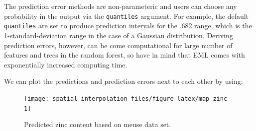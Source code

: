 \documentclass[
  graybox,natbib,nospthms]{svmono}
\newenvironment{Shaded}{\begin{snugshade}}{\end{snugshade}}
\newcommand{\AttributeTok}[1]{\textcolor[rgb]{0.61,0.61,0.61}{#1}}
\newcommand{\ConstantTok}[1]{\textcolor[rgb]{0,0,0}{#1}}
\newcommand{\DecValTok}[1]{\textcolor[rgb]{0.06,0.06,0.06}{#1}}
\newcommand{\FunctionTok}[1]{\textcolor[rgb]{0,0,0}{#1}}
\newcommand{\NormalTok}[1]{#1}
\newcommand{\SpecialCharTok}[1]{\textcolor[rgb]{0,0,0}{#1}}
\newcommand{\StringTok}[1]{\textcolor[rgb]{0.5,0.5,0.5}{#1}}
\begin{document}
The prediction error methods are non-parameteric and users can choose any
probability in the output via the \texttt{quantiles} argument. For example, the default
\texttt{quantiles} are set to produce prediction intervals for the .682 range, which
is the 1-standard-deviation range in the case of a Gaussian distribution.
Deriving prediction errors, however, can be come computational for large number
of features and trees in the random forest, so have in mind that EML comes with
exponentially increased computing time.

We can plot the predictions and prediction errors next to each other by using:

\begin{Shaded}
\end{Shaded}

\begin{figure}

{\centering \texttt{[image: spatial-interpolation\_files/figure-latex/map-zinc-1]} 

}

\caption{Predicted zinc content based on meuse data set.}\label{fig:map-zinc}
\end{figure}
\end{document}
